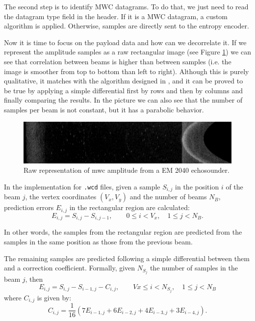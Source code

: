 The second step is to identify MWC datagrams. To do that, we just need to read the datagram type field in the header. If it is a MWC datagram, a custom algorithm is applied. Otherwise, samples are directly sent to the entropy encoder.

Now it is time to focus on the payload data and how can we decorrelate it. If we represent the amplitude samples as a raw rectangular image (see Figure \ref{fig:wc_amplitude}) we can see that correlation between beams is higher than between samples (i.e. the image is smoother from top to bottom than left to right). Although this is purely qualitative, it matches with the algorithm designed in \parencite{Portell2019}, and it can be proved to be true by applying a simple differential first by rows and then by columns and finally comparing the results. In the picture we can also see that the number of samples per beam is not constant, but it has a parabolic behavior.
\begin{figure}[h!]
	\begin{center}
		\includegraphics[scale=0.334]{images/water_column_amp.png}
	\end{center}
	\caption{Raw representation of \acrshort{mwc} amplitude from a EM 2040 echosounder.}
	\label{fig:wc_amplitude}
\end{figure}

In the implementation for \texttt{.wcd} files, given a sample $S_{i,j}$ in the position $i$ of the beam $j$, the vertex coordinates $(V_x, V_y)$ and the number of beams $N_B$, prediction errors $E_{i,j}$ in the rectangular region are calculated:
\begin{equation}
E_{i,j} = S_{i,j} - S_{i,j-1}, \qquad 0 \leq i < V_x, \quad 1 \leq j < N_B.
\end{equation}

In other words, the samples from the rectangular region are predicted from the samples in the same position as those from the previous beam.

The remaining samples are predicted following a simple differential between them and a correction coefficient. Formally, given $N_{S_j}$ the number of samples in the beam $j$, then
\begin{equation}
E_{i,j} = S_{i,j} - S_{i-1,j} - C_{i,j}, \qquad Vx \leq i < N_{S_j}, \quad 1 \leq j < N_B
\end{equation}
where $C_{i,j}$ is given by:
\begin{equation}
C_{i,j} = \frac{1}{16}(7E_{i-1,j} + 6E_{i-2,j} + 4E_{i-3,j} + 3E_{i-4,j}).
\end{equation}

